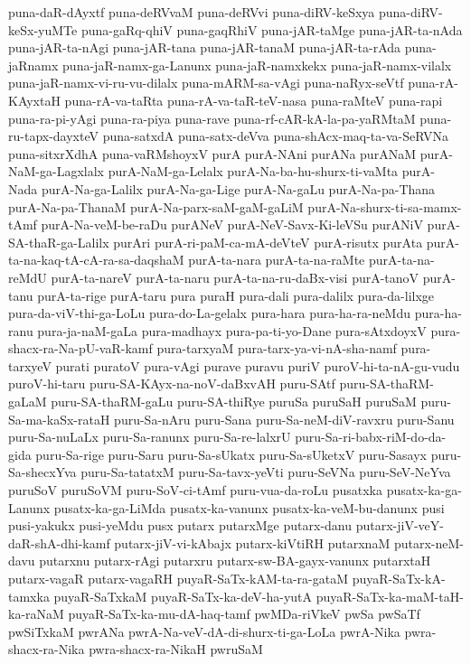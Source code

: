 {puna-daR-dAyxtf
puna-deRVvaM
puna-deRVvi
puna-diRV-keSxya
puna-diRV-keSx-yuMTe
puna-gaRq-qhiV
puna-gaqRhiV
puna-jAR-taMge
puna-jAR-ta-nAda
puna-jAR-ta-nAgi
puna-jAR-tana
puna-jAR-tanaM
puna-jAR-ta-rAda
puna-jaRnamx
puna-jaR-namx-ga-Lanunx
puna-jaR-namxkekx
puna-jaR-namx-vilalx
puna-jaR-namx-vi-ru-vu-dilalx
puna-mARM-sa-vAgi
puna-naRyx-seVtf
puna-rA-KAyxtaH
puna-rA-va-taRta
puna-rA-va-taR-teV-nasa
puna-raMteV
puna-rapi
puna-ra-pi-yAgi
puna-ra-piya
puna-rave
puna-rf-cAR-kA-la-pa-yaRMtaM
puna-ru-tapx-dayxteV
puna-satxdA
puna-satx-deVva
puna-shAcx-maq-ta-va-SeRVNa
puna-sitxrXdhA
puna-vaRMshoyxV
purA
purA-NAni
purANa
purANaM
purA-NaM-ga-Lagxlalx
purA-NaM-ga-Lelalx
purA-Na-ba-hu-shurx-ti-vaMta
purA-Nada
purA-Na-ga-Lalilx
purA-Na-ga-Lige
purA-Na-gaLu
purA-Na-pa-Thana
purA-Na-pa-ThanaM
purA-Na-parx-saM-gaM-gaLiM
purA-Na-shurx-ti-sa-mamx-tAmf
purA-Na-veM-be-raDu
purANeV
purA-NeV-Savx-Ki-leVSu
purANiV
purA-SA-thaR-ga-Lalilx
purAri
purA-ri-paM-ca-mA-deVteV
purA-risutx
purAta
purA-ta-na-kaq-tA-cA-ra-sa-daqshaM
purA-ta-nara
purA-ta-na-raMte
purA-ta-na-reMdU
purA-ta-nareV
purA-ta-naru
purA-ta-na-ru-daBx-visi
purA-tanoV
purA-tanu
purA-ta-rige
purA-taru
pura
puraH
pura-dali
pura-dalilx
pura-da-lilxge
pura-da-viV-thi-ga-LoLu
pura-do-La-gelalx
pura-hara
pura-ha-ra-neMdu
pura-ha-ranu
pura-ja-naM-gaLa
pura-madhayx
pura-pa-ti-yo-Dane
pura-sAtxdoyxV
pura-shacx-ra-Na-pU-vaR-kamf
pura-tarxyaM
pura-tarx-ya-vi-nA-sha-namf
pura-tarxyeV
purati
puratoV
pura-vAgi
purave
puravu
puriV
puroV-hi-ta-nA-gu-vudu
puroV-hi-taru
puru-SA-KAyx-na-noV-daBxvAH
puru-SAtf
puru-SA-thaRM-gaLaM
puru-SA-thaRM-gaLu
puru-SA-thiRye
puruSa
puruSaH
puruSaM
puru-Sa-ma-kaSx-rataH
puru-Sa-nAru
puru-Sana
puru-Sa-neM-diV-ravxru
puru-Sanu
puru-Sa-nuLaLx
puru-Sa-ranunx
puru-Sa-re-lalxrU
puru-Sa-ri-babx-riM-do-da-gida
puru-Sa-rige
puru-Saru
puru-Sa-sUkatx
puru-Sa-sUketxV
puru-Sasayx
puru-Sa-shecxYva
puru-Sa-tatatxM
puru-Sa-tavx-yeVti
puru-SeVNa
puru-SeV-NeYva
puruSoV
puruSoVM
puru-SoV-ci-tAmf
puru-vua-da-roLu
pusatxka
pusatx-ka-ga-Lanunx
pusatx-ka-ga-LiMda
pusatx-ka-vanunx
pusatx-ka-veM-bu-danunx
pusi
pusi-yakukx
pusi-yeMdu
pusx
putarx
putarxMge
putarx-danu
putarx-jiV-veY-daR-shA-dhi-kamf
putarx-jiV-vi-kAbajx
putarx-kiVtiRH
putarxnaM
putarx-neM-davu
putarxnu
putarx-rAgi
putarxru
putarx-sw-BA-gayx-vanunx
putarxtaH
putarx-vagaR
putarx-vagaRH
puyaR-SaTx-kAM-ta-ra-gataM
puyaR-SaTx-kA-tamxka
puyaR-SaTxkaM
puyaR-SaTx-ka-deV-ha-yutA
puyaR-SaTx-ka-maM-taH-ka-raNaM
puyaR-SaTx-ka-mu-dA-haq-tamf
pwMDa-riVkeV
pwSa
pwSaTf
pwSiTxkaM
pwrANa
pwrA-Na-veV-dA-di-shurx-ti-ga-LoLa
pwrA-Nika
pwra-shacx-ra-Nika
pwra-shacx-ra-NikaH
pwruSaM
}
